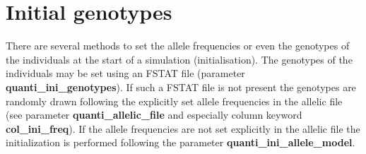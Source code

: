 \documentclass[letterpaper,12pt,oneside]{book}
\begin{document}
\section{Initial genotypes}\label{iniGenoQuanti}
There are several methods to set the allele frequencies or even the genotypes of the individuals at the start of a simulation (initialisation). The genotypes of the individuals may be set using an FSTAT file \citep{Goudet_1995} (parameter \textbf{quanti\_ini\_genotypes}). If such a FSTAT file is not present the genotypes are randomly drawn following the explicitly set allele frequencies in the allelic file (see parameter \textbf{quanti\_allelic\_file} and especially column keyword \textbf{col\_ini\_freq}). If the allele frequencies are not set explicitly in the allelic file the initialization is performed following the parameter \textbf{quanti\_ini\_allele\_model}.  
\end{document}
